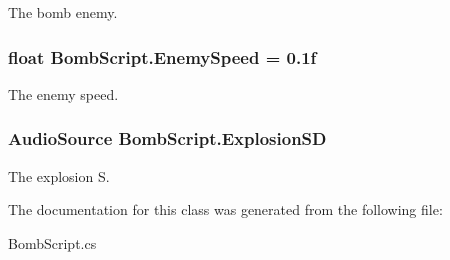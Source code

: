 The bomb enemy. 

\hypertarget{classBombScript_afba19f8bfc4dcd938590b616b81de052}{
\subsubsection[{Enemy\-Speed}]{\setlength{\rightskip}{0pt plus 5cm}float Bomb\-Script.\-Enemy\-Speed = 0.\-1f}}\label{classBombScript_afba19f8bfc4dcd938590b616b81de052}


The enemy speed. 

\hypertarget{classBombScript_a1c1f970bb78dc842d25b57d37c963c0e}{
\subsubsection[{Explosion\-S\-D}]{\setlength{\rightskip}{0pt plus 5cm}Audio\-Source Bomb\-Script.\-Explosion\-S\-D}}\label{classBombScript_a1c1f970bb78dc842d25b57d37c963c0e}


The explosion S. 



The documentation for this class was generated from the following file\-:\begin{DoxyCompactItemize}
\item 
Bomb\-Script.\-cs\end{DoxyCompactItemize}
